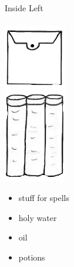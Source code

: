 \documentclass[11pt]{article}
\begin{document}
\\
\vspace{1.5cm}
\\
\begin{minipage}[t]{.05\textwidth}
    \ 
\end{minipage}
\begin{minipage}[t]{.248\textwidth}
    \normalsize{Inside Left}\\
    \\
    \includegraphics[height=7.0cm]{img/Scrolls-herbs.png}\\
    \begin{normalsize}
        \begin{itemize}[topsep=0pt, itemsep=0pt, partopsep=0pt, parsep=0pt]
            \item stuff for spells
            \item holy water
            \item oil
            \item potions
        \end{itemize}
        \end{normalsize}
\end{minipage}
\end{document}
